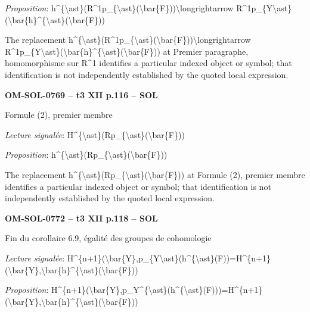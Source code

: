 \emph{Proposition}: h\textasciicircum{}\{\textbackslash{}ast\}(R\textasciicircum{}1p\_\{\textbackslash{}ast\}(\textbackslash{}bar\{F\}))\textbackslash{}longrightarrow R\textasciicircum{}1p\_\{Y\textbackslash{}ast\}(\textbackslash{}bar\{h\}\textasciicircum{}\{\textbackslash{}ast\}(\textbackslash{}bar\{F\}))\par
The replacement h\textasciicircum{}\{\textbackslash{}ast\}(R\textasciicircum{}1p\_\{\textbackslash{}ast\}(\textbackslash{}bar\{F\}))\textbackslash{}longrightarrow R\textasciicircum{}1p\_\{Y\textbackslash{}ast\}(\textbackslash{}bar\{h\}\textasciicircum{}\{\textbackslash{}ast\}(\textbackslash{}bar\{F\})) at Premier paragraphe, homomorphisme sur R\textasciicircum{}1 identifies a particular indexed object or symbol; that identification is not independently established by the quoted local expression.\par
\par\noindent\textbf{OM-SOL-0769 -- t3 XII p.116 -- SOL}\par
Formule (2), premier membre\par
\emph{Lecture signalée}: H\textasciicircum{}\{\textbackslash{}ast\}(Rp\_\{\textbackslash{}ast\}(\textbackslash{}bar\{F\}))\par
\emph{Proposition}: h\textasciicircum{}\{\textbackslash{}ast\}(Rp\_\{\textbackslash{}ast\}(\textbackslash{}bar\{F\}))\par
The replacement h\textasciicircum{}\{\textbackslash{}ast\}(Rp\_\{\textbackslash{}ast\}(\textbackslash{}bar\{F\})) at Formule (2), premier membre identifies a particular indexed object or symbol; that identification is not independently established by the quoted local expression.\par
\par\noindent\textbf{OM-SOL-0772 -- t3 XII p.118 -- SOL}\par
Fin du corollaire 6.9, égalité des groupes de cohomologie\par
\emph{Lecture signalée}: H\textasciicircum{}\{n+1\}(\textbackslash{}bar\{Y\},p\_\{Y\textbackslash{}ast\}(h\textasciicircum{}\{\textbackslash{}ast\}(F))=\allowbreak H\textasciicircum{}\{n+1\}(\textbackslash{}bar\{Y\},\textbackslash{}bar\{h\}\textasciicircum{}\{\textbackslash{}ast\}(\textbackslash{}bar\{F\}))\par
\emph{Proposition}: H\textasciicircum{}\{n+1\}(\textbackslash{}bar\{Y\},p\_Y\textasciicircum{}\{\textbackslash{}ast\}(h\textasciicircum{}\{\textbackslash{}ast\}(F)))=\allowbreak H\textasciicircum{}\{n+1\}(\textbackslash{}bar\{Y\},\textbackslash{}bar\{h\}\textasciicircum{}\{\textbackslash{}ast\}(\textbackslash{}bar\{F\}))\par
